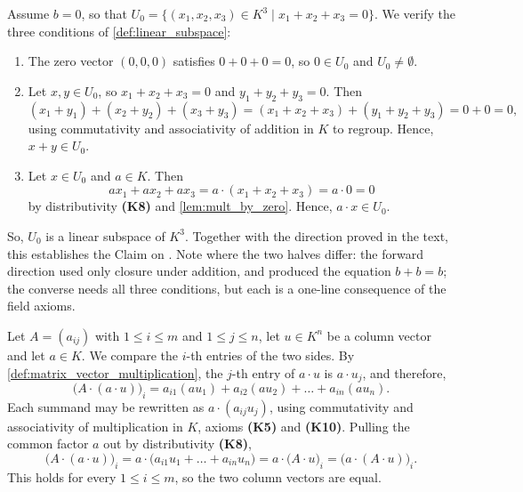 \begin{exercisesolution}
\label{sol:U_b_converse}
Assume $b = 0$, so that $U_0 = \{(x_1, x_2, x_3) \in K^3 \mid x_1 + x_2 + x_3 = 0\}$. We verify the three conditions of \cref{def:linear_subspace}:
\begin{enumerate}[label=\textbf{(LSS\arabic*)}]
    \item The zero vector $(0,0,0)$ satisfies $0 + 0 + 0 = 0$, so $0 \in U_0$ and $U_0 \neq \emptyset$.

    \item Let $x, y \in U_0$, so $x_1 + x_2 + x_3 = 0$ and $y_1 + y_2 + y_3 = 0$. Then
    \[
        (x_1 + y_1) + (x_2 + y_2) + (x_3 + y_3) = (x_1 + x_2 + x_3) + (y_1 + y_2 + y_3) = 0 + 0 = 0,
    \]
    using commutativity and associativity of addition in $K$ to regroup. Hence, $x + y \in U_0$.

    \item Let $x \in U_0$ and $a \in K$. Then
    \[
        a x_1 + a x_2 + a x_3 = a \cdot (x_1 + x_2 + x_3) = a \cdot 0 = 0
    \]
    by distributivity \textbf{(K8)} and \cref{lem:mult_by_zero}. Hence, $a \cdot x \in U_0$.
\end{enumerate}

So, $U_0$ is a linear subspace of $K^3$. Together with the direction proved in the text, this establishes the Claim on . Note where the two halves differ: the forward direction used only closure under addition, and produced the equation $b + b = b$; the converse needs all three conditions, but each is a one-line consequence of the field axioms.
\end{exercisesolution}

\begin{exercisesolution}
\label{sol:matrix_vector_scalar}
Let $A = (a_{ij})$ with $1 \le i \le m$ and $1 \le j \le n$, let $u \in K^n$ be a column vector and let $a \in K$. We compare the $i$-th entries of the two sides. By \cref{def:matrix_vector_multiplication}, the $j$-th entry of $a \cdot u$ is $a \cdot u_j$, and therefore,
\[
    \bigl(A \cdot (a \cdot u)\bigr)_i = a_{i1}(a u_1) + a_{i2}(a u_2) + \dots + a_{in}(a u_n).
\]
Each summand may be rewritten as $a \cdot (a_{ij} u_j)$, using commutativity and associativity of multiplication in $K$, axioms \textbf{(K5)} and \textbf{(K10)}. Pulling the common factor $a$ out by distributivity \textbf{(K8)},
\[
    \bigl(A \cdot (a \cdot u)\bigr)_i = a \cdot \bigl(a_{i1}u_1 + \dots + a_{in}u_n\bigr) = a \cdot \bigl(A \cdot u\bigr)_i = \bigl(a \cdot (A \cdot u)\bigr)_i.
\]
This holds for every $1 \le i \le m$, so the two column vectors are equal.
\end{exercisesolution}

